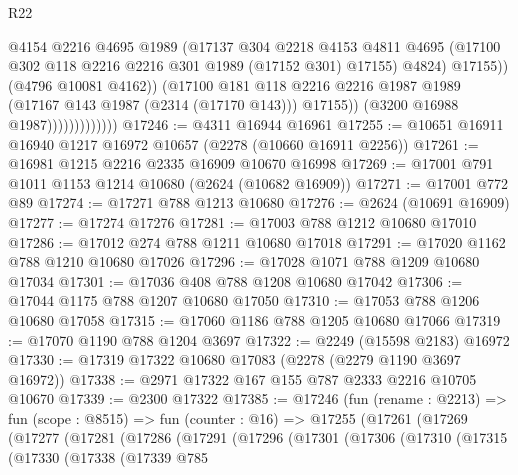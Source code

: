 \begin{lexlean}{R22}
\begin{coremodule}
                                    @4154
                                    @2216
                                    @4695
                                    @1989
                                    (@17137
                                      @304
                                      @2218
                                      @4153
                                      @4811
                                      @4695
                                      (@17100 @302 @118 @2216 @2216 @301 @1989 (@17152 @301) @17155)
                                      @4824)
                                    @17155))
                                (@4796 @10081 @4162))
                              (@17100
                                @181
                                @118
                                @2216
                                @2216
                                @1987
                                @1989
                                (@17167 @143 @1987 (@2314 (@17170 @143)))
                                @17155))
                            (@3200 @16988 @1987)))))))))))))
@17246 := @4311 @16944 @16961
@17255 := @10651 @16911 @16940 @1217 @16972 @10657 (@2278 (@10660 @16911 @2256))
@17261 := @16981 @1215 @2216 @2335 @16909 @10670 @16998
@17269 := @17001 @791 @1011 @1153 @1214 @10680 (@2624 (@10682 @16909))
@17271 := @17001 @772 @89
@17274 := @17271 @788 @1213 @10680
@17276 := @2624 (@10691 @16909)
@17277 := @17274 @17276
@17281 := @17003 @788 @1212 @10680 @17010
@17286 := @17012 @274 @788 @1211 @10680 @17018
@17291 := @17020 @1162 @788 @1210 @10680 @17026
@17296 := @17028 @1071 @788 @1209 @10680 @17034
@17301 := @17036 @408 @788 @1208 @10680 @17042
@17306 := @17044 @1175 @788 @1207 @10680 @17050
@17310 := @17053 @788 @1206 @10680 @17058
@17315 := @17060 @1186 @788 @1205 @10680 @17066
@17319 := @17070 @1190 @788 @1204 @3697
@17322 := @2249 (@15598 @2183) @16972
@17330 := @17319 @17322 @10680 @17083 (@2278 (@2279 @1190 @3697 @16972))
@17338 := @2971 @17322 @167 @155 @787 @2333 @2216 @10705 @10670
@17339 := @2300 @17322
@17385 := @17246
    (fun (rename : @2213) =>
    fun (scope : @8515) =>
    fun (counter : @16) =>
    @17255
      (@17261
        (@17269
          (@17277
            (@17281
              (@17286
                (@17291
                  (@17296
                    (@17301
                      (@17306
                        (@17310
                          (@17315
                            (@17330
                              (@17338
                                (@17339
                                  @785

\end{coremodule}
\end{lexlean}
